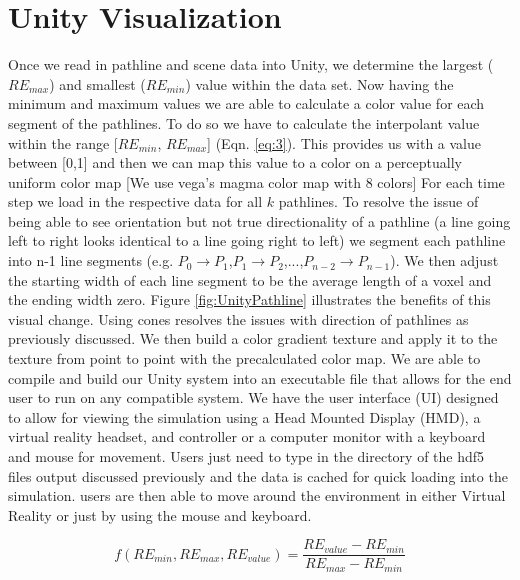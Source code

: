 \section{Unity Visualization}
Once we read in pathline and scene data into Unity,
we determine the largest (\ensuremath{RE_{max}}) and smallest (\ensuremath{RE_{min}}) value within the data set.  Now having the minimum and maximum values we are  able to calculate a color value for each segment of the pathlines. To do so we have to calculate the interpolant value within the range [\ensuremath{RE_{min}}, \ensuremath{RE_{max}}] (Eqn. \ref{eq:3}). This provides us with a value between [0,1] and then we can map this value to a color on a perceptually uniform color map \color{red} [We use  vega's magma color map with 8 colors] \color{black} For each time step we load in the respective data for all \ensuremath{k} pathlines. To resolve the issue of being able to see orientation but not true directionality of a pathline (a line going left to right looks identical to a line going right to left) we segment each pathline into n-1 line segments  (e.g. \ensuremath{P_0\rightarrow P_1},\ensuremath{P_1 \rightarrow P_2},...,\ensuremath{P_{n-2} \rightarrow P_{n-1}}).
We then adjust the starting width of each line segment to be the average length of a voxel and the ending width zero. Figure \ref{fig:UnityPathline} illustrates the benefits of this visual change. Using cones resolves the issues with direction of pathlines as previously discussed. We then build a color gradient texture and apply it to the texture from point to point with the precalculated color map. We are able to compile and build our Unity system into an executable file that allows for the end user to run on any compatible system. We have the user interface (UI) designed to allow for viewing the simulation using a Head Mounted Display (HMD), a virtual reality headset, and controller or a computer monitor with a keyboard and mouse for movement. Users just need to  type in the directory of the hdf5 files output discussed previously and the data is cached for quick loading into the simulation. users are then able to move around  the environment in either Virtual Reality or just by using the mouse and keyboard. 

\begin{equation} \label{eq:3}
f(RE_{min},RE_{max},RE_{value}) = \frac{RE_{value}-RE_{min}}{RE_{max}-RE_{min}}
\end{equation} 

